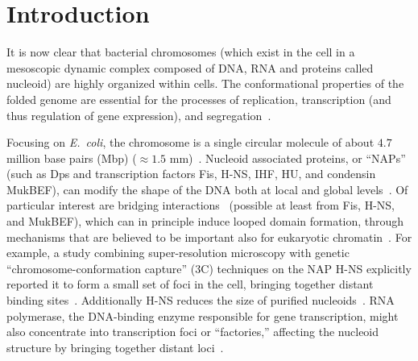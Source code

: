 \documentclass[
preprint,
a4paper,
12pt,
superscriptaddress,
pre]{revtex4}
\begin{document}
\maketitle




\section{Introduction} 

%

It is now clear that bacterial chromosomes (which exist in the cell in
a mesoscopic dynamic complex composed of DNA, RNA and proteins called
nucleoid) are highly organized within cells. The conformational
properties of the folded genome are essential for the processes of
replication, transcription (and thus regulation of gene expression),
and segregation~\cite{Benza2012,Dillon2010,Muskhelishvili2010}.


Focusing on \emph{E.~coli}, the chromosome is a single circular
molecule of about $4.7$ million base pairs (Mbp) ($\approx1.5$
mm)~\cite{Trun1998,Stavans2006}. Nucleoid associated proteins, or
``NAPs'' (such as Dps and transcription factors Fis, H-NS, IHF, HU,
and condensin MukBEF), can modify the shape of the DNA both at local
and global levels~\cite{Dillon2010,LNW+06,Ohniwa2011}.
%
Of particular interest are bridging interactions~\cite{Wiggins2009}
(possible at least from Fis, H-NS, and MukBEF), which can in principle
induce looped domain formation, through mechanisms that are believed
to be important also for eukaryotic
chromatin~\cite{Brackley2013,Barbieri2013b}.  For example, a study
combining super-resolution microscopy with genetic
``chromosome-conformation capture'' (3C) techniques on the NAP H-NS
explicitly reported it to form a small set of foci in the cell,
bringing together distant binding sites~\cite{Wang2011a}. Additionally
H-NS
reduces the size of purified nucleoids~\cite{Thacker2013}.
RNA polymerase, the DNA-binding enzyme responsible for gene
transcription, might also concentrate into transcription foci or
``factories,'' affecting the nucleoid structure by bringing together
distant loci~\cite{JC06,GHH+05}.
\end{document}
